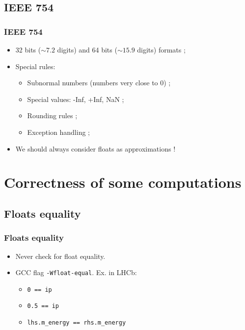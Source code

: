 \documentclass{beamer}
\begin{document}
\subsection{IEEE 754}

\begin{frame}
    \frametitle{IEEE 754}

    \begin{itemize}
        \item 32 bits ($\sim 7.2$ digits) and 64 bits ($\sim 15.9$ digits) formats ;
        \item Special rules:
              \begin{itemize}
                  \item Subnormal numbers (numbers very close to $0$) ;
                  \item Special values: -Inf, +Inf, NaN ;
                  \item Rounding rules ;
                  \item Exception handling ;
              \end{itemize}
        \item We should always consider floats as approximations !
    \end{itemize}
\end{frame}

\section{Correctness of some computations}

\begin{frame}
    \tableofcontents[currentsection]
\end{frame}

\subsection{Floats equality}

\begin{frame}[fragile]
    \frametitle{Floats equality}

    \begin{itemize}
        \item Never check for float equality.
        \item GCC flag \verb'-Wfloat-equal'.
              Ex. in LHCb:
              \begin{itemize}
                  \item \verb'0 == ip'
                  \item \verb'0.5 == ip'
                  \item \verb'lhs.m_energy == rhs.m_energy'
              \end{itemize}
    \end{itemize}
\end{frame}
\end{document}
